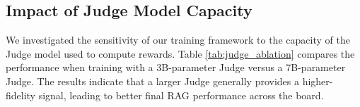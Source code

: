 \documentclass[11pt]{article}
\begin{document}
\subsection{Impact of Judge Model Capacity}

We investigated the sensitivity of our training framework to the capacity of the Judge model used to compute rewards. Table \ref{tab:judge_ablation} compares the performance when training with a 3B-parameter Judge versus a 7B-parameter Judge. The results indicate that a larger Judge generally provides a higher-fidelity signal, leading to better final RAG performance across the board.

\begin{table}[p]
\small
\centering
\caption{Ablation on Judge Model Size. We report the downstream RAG F1 scores using \textbf{Qwen-7B} as the KG constructor. Training with a stronger Judge (7B) generally yields better downstream performance than a smaller Judge (3B).}
\label{tab:judge_ablation}
\end{table}
\end{document}
